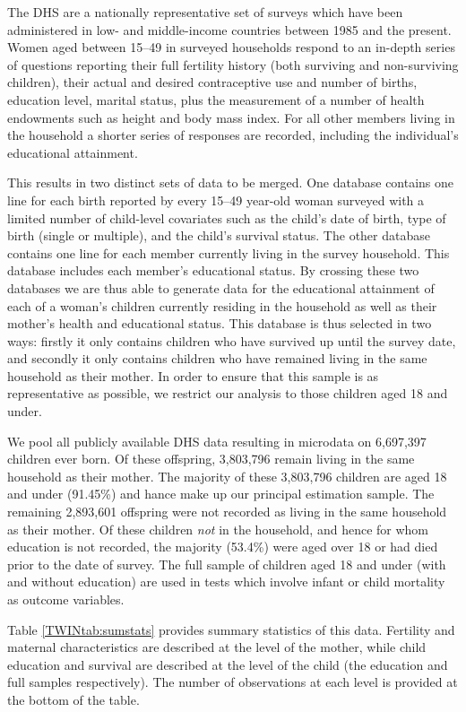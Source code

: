 The DHS are a nationally representative set of surveys which have been 
administered in low- and middle-income countries between 1985 and the present.
Women aged between 15--49 in surveyed households respond to an in-depth series 
of questions reporting their full fertility history (both surviving and 
non-surviving children), their actual and desired contraceptive use and number
of births, education level, marital status, plus the measurement of a 
number of health endowments such as height and body mass index.  For all other 
members living in the household a shorter series of responses are recorded, 
including the individual's educational attainment.

This results in two distinct sets of data to be merged.  One database contains
one line for each birth reported by every 15--49 year-old woman surveyed with
a limited number of child-level covariates such as the child's date of birth,
type of birth (single or multiple), and the child's survival status.  The other
database contains one line for each member currently living in the survey 
household.  This database includes each member's educational status.  By 
crossing these two databases we are thus able to generate data for the
educational attainment of each of a woman's children currently residing in the 
household as well as their mother's health and educational status.  This 
database is thus selected in two ways: firstly it only contains children who
have survived up until the survey date, and secondly it only contains children
who have remained living in the same household as their mother.  In order to
ensure that this sample is as representative as possible, we restrict our
analysis to those children aged 18 and under.

We pool all publicly available DHS data resulting in microdata on 6,697,397 
children ever born.  Of these offspring, 3,803,796 remain living in the same
household as their mother.  The majority of these 3,803,796 children are aged
18 and under (91.45\%) and hance make up our principal estimation sample.  The
remaining 2,893,601 offspring were not recorded as living in the same household
as their mother.  Of these children \emph{not} in the household, and hence for 
whom education is not recorded, the majority (53.4\%) were aged over 18 or had 
died prior to the date of survey.  The full sample of children aged 18 and 
under (with and without education) are used in tests which involve infant or
child mortality as outcome variables.

Table \ref{TWINtab:sumstats} provides summary statistics of this data.  
Fertility and maternal characteristics are described at the level of the 
mother, while child education and survival are described at the level of the
child (the education and full samples respectively).  The number of 
observations at each level is provided at the bottom of the table.

